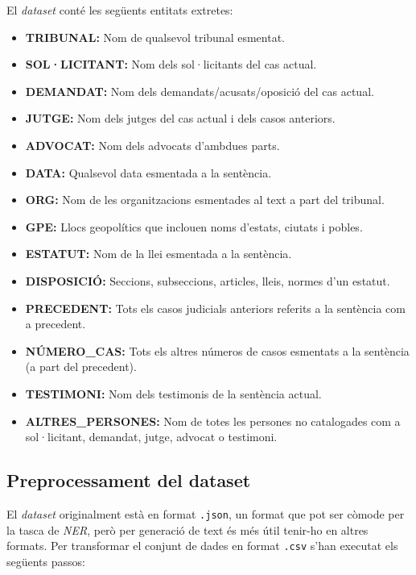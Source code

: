 El \textit{dataset} conté les següents entitats extretes:
\begin{itemize}
  \item \textbf{TRIBUNAL:} Nom de qualsevol tribunal esmentat.
  \item \textbf{SOL·LICITANT:} Nom dels sol·licitants del cas actual.
  \item \textbf{DEMANDAT:} Nom dels demandats/acusats/oposició del cas actual.
  \item \textbf{JUTGE:} Nom dels jutges del cas actual i dels casos anteriors.
  \item \textbf{ADVOCAT:} Nom dels advocats d'ambdues parts.
  \item \textbf{DATA:} Qualsevol data esmentada a la sentència.
  \item \textbf{ORG:} Nom de les organitzacions esmentades al text a part del tribunal.
  \item \textbf{GPE:} Llocs geopolítics que inclouen noms d'estats, ciutats i pobles.
  \item \textbf{ESTATUT:} Nom de la llei esmentada a la sentència.
  \item \textbf{DISPOSICIÓ:} Seccions, subseccions, articles, lleis, normes d'un estatut.
  \item \textbf{PRECEDENT:} Tots els casos judicials anteriors referits a la sentència com a precedent.
  \item \textbf{NÚMERO\_CAS:} Tots els altres números de casos esmentats a la sentència (a part del precedent).
  \item \textbf{TESTIMONI:} Nom dels testimonis de la sentència actual.
  \item \textbf{ALTRES\_PERSONES:} Nom de totes les persones no catalogades com a \linebreak sol·licitant, demandat, jutge, advocat o testimoni.
\end{itemize}



\subsection{Preprocessament del dataset}
El \textit{dataset} originalment està en format \texttt{.json}, un format que pot ser còmode per la tasca de \textit{NER}, però per generació de text és més útil tenir-ho en altres formats. Per transformar el conjunt de dades en format \texttt{.csv} s'han executat els següents passos:


